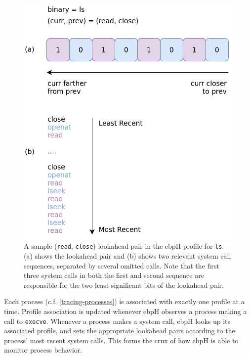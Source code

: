 \documentclass[
  12pt]{findlay}
\newcommand{\passthrough}[1]{#1}
\begin{document}
\begin{figure}
    \caption[A sample (\lstinline{read}, \lstinline{close}) lookahead pair in the ebpH profile for \lstinline{ls}.]{
        A sample (\lstinline{read}, \lstinline{close}) lookahead pair in the ebpH profile for \lstinline{ls}.
        (a) shows the lookahead pair and (b) shows two relevant system call sequences, separated by several omitted calls.
        Note that the first three system calls in both the first and second sequence are responsible for
        the two least significant bits of the lookahead pair.
    }
    \label{lookahead-ls}
    \includegraphics[height=0.4\textheight]{../figures/lookahead-ls.png}
\end{figure}

Each process (c.f. \autoref{tracing-processes}) is associated with
exactly one profile at a time. Profile association is updated whenever
ebpH observes a process making a call to
\passthrough{\lstinline!execve!}. Whenever a process makes a system
call, ebpH looks up its associated profile, and sets the appropriate
lookahead pairs according to the process' most recent system calls. This
forms the crux of how ebpH is able to monitor process behavior.
\end{document}
